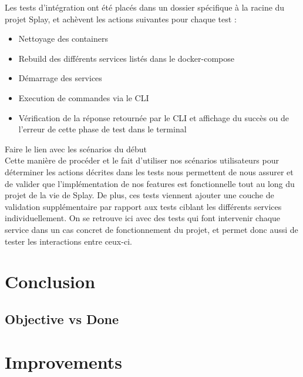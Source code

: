 \documentclass{eplmastersthesis}
\begin{document}
      Les tests d'intégration ont été placés dans un dossier spécifique à la
      racine du projet Splay, et achèvent les actions suivantes pour chaque
      test : \\

      \begin{itemize}
        \item Nettoyage des containers
        \item Rebuild des différents services listés dans le docker-compose
        \item Démarrage des services
        \item Execution de commandes via le CLI
        \item Vérification de la réponse retournée par le CLI et affichage du
        succès ou de l'erreur de cette phase de test dans le terminal
      \end{itemize}

      {\color{red} Faire le lien avec les scénarios du début}\\

      Cette manière de procéder et le fait d'utiliser nos scénarios utilisateurs
      pour déterminer les actions décrites dans les tests nous permettent de
      nous assurer et de valider que l'implémentation de nos features est
      fonctionnelle tout au long du projet de la vie de Splay. De plus, ces
      tests viennent ajouter une couche de validation supplémentaire par rapport
      aux tests ciblant les différents services individuellement. On se retrouve
      ici avec des tests qui font intervenir chaque service dans un cas concret
      de fonctionnement du projet, et permet donc aussi de tester les interactions
      entre ceux-ci.

  \chapter{Conclusion}

    \section{Objective vs Done}

    \section{}

  \chapter{Improvements}


  \nocite{*}
  
  




  \backcoverpage
\end{document}
